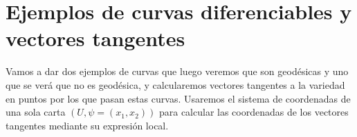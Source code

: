 \documentclass[twoside, 11pt]{article}
\theoremstyle{definition}
\newcommand{\R}{\mathbb{R}}
\begin{document}
\section{Ejemplos de curvas diferenciables y vectores tangentes}

Vamos a dar dos ejemplos de curvas que luego veremos que son geodésicas y uno que se verá que no es geodésica, y calcularemos vectores tangentes a la variedad en puntos por los que pasan estas curvas. Usaremos el sistema de coordenadas de una sola carta $(U, \psi=(x_1,x_2))$ para calcular las coordenadas de los vectores tangentes mediante su expresión local.

%
%
%
\end{document}
